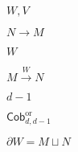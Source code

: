 \begin{preview}
\setcounter{equation}{0}%
\( W,V \)
\end{preview}

\begin{preview}
\setcounter{equation}{0}%
\( N \to M \)
\end{preview}

\begin{preview}
\setcounter{equation}{0}%
\( W \)
\end{preview}

\begin{preview}
\setcounter{equation}{0}%
\( M \xrightarrow{W}N  \)
\end{preview}

\begin{preview}
\setcounter{equation}{0}%
\( d-1 \)
\end{preview}

\begin{preview}
\setcounter{equation}{0}%
\( \mathsf{Cob}_{d,d-1}^{\mathrm{or}} \)
\end{preview}

\begin{preview}
\setcounter{equation}{0}%
\( \partial W = M\sqcup N \)
\end{preview}


